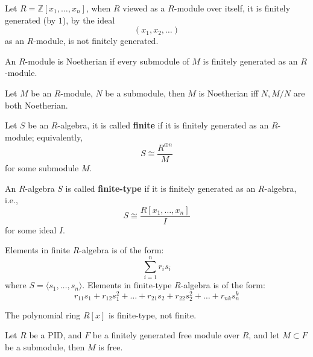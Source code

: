 \documentclass[openany]{book}
\newcommand{\Z}{\mathbb{Z}}
\newcommand{\la}{\langle}
\newcommand{\ra}{\rangle}
\begin{document}
\begin{example}
    Let $R=\Z[x_1,\dots,x_n]$, when $R$ viewed as a $R$-module over itself, it is finitely generated (by $1$), by the ideal 
    \begin{equation*}
        (x_1,x_2,\dots)
    \end{equation*}
    as an $R$-module, is not finitely generated. 
\end{example}

\begin{defn}
    An $R$-module is Noetherian if every submodule of $M$ is finitely generated as an $R$-module.
\end{defn}

\begin{prop}
    Let $M$ be an $R$-module, $N$ be a submodule, then $M$ is Noetherian iff $N,M/N$ are both Noetherian.
\end{prop}

\begin{defn}
    Let $S$ be an $R$-algebra, it is called \textbf{finite} if it is finitely generated as an $R$-module; equivalently, 
    \begin{equation*}
        S\cong\frac{R^{\oplus n}}{M}
    \end{equation*}
    for some submodule $M$. 

    An $R$-algebra $S$ is called \textbf{finite-type} if it is finitely generated as an $R$-algebra, i.e., 
    \begin{equation*}
        S\cong\frac{R[x_1,\dots, x_n]}{I}
    \end{equation*}
    for some ideal $I$.
\end{defn}
Elements in finite $R$-algebra is of the form:
\begin{equation*}
    \sum_{i=1}^nr_is_i
\end{equation*}
where $S=\la s_1,\dots, s_n\ra$. Elements in finite-type $R$-algebra is of the form:
\begin{equation*}
    r_{11}s_1+r_{12}s_1^2+\dots+r_{21}s_2+r_{22}s_2^2+\dots+r_{nk}s_n^k
\end{equation*}


\begin{prop}
    The polynomial ring $R[x]$ is finite-type, not finite.
\end{prop}


\begin{prop}
    Let $R$ be a PID, and $F$ be a finitely generated free module over $R$, and let $M\subset F$ be a submodule, then $M$ is free.
\end{prop}
\end{document}
